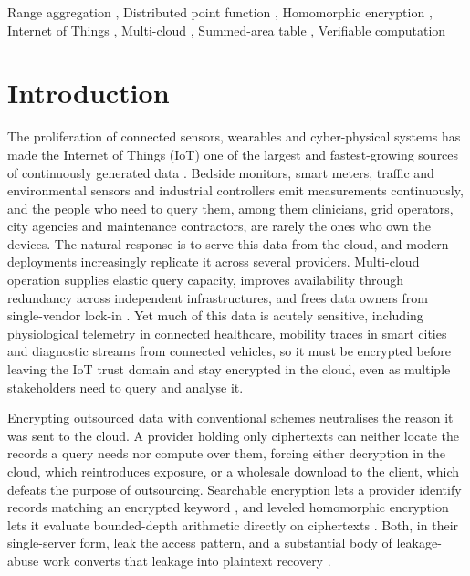 \documentclass[a4paper,fleqn]{cas-sc}
\begin{document}
\begin{keywords}
Range aggregation \sep
Distributed point function \sep
Homomorphic encryption \sep
Internet of Things \sep
Multi-cloud \sep
Summed-area table \sep
Verifiable computation
\end{keywords}

\maketitle

\section{Introduction}
\label{sec:intro}

The proliferation of connected sensors, wearables and cyber-physical systems
has made the Internet of Things (IoT) one of the largest and fastest-growing
sources of continuously generated data \citep{atzori2010internet}. Bedside
monitors, smart meters, traffic and environmental sensors and industrial
controllers emit measurements continuously, and the people who need to query
them, among them clinicians, grid operators, city agencies and maintenance
contractors, are rarely the ones who own the devices. The natural response is
to serve this data from the cloud, and modern deployments increasingly
replicate it across several providers. Multi-cloud operation supplies elastic
query capacity, improves availability through redundancy across independent
infrastructures, and frees data owners from single-vendor lock-in
\citep{petcu2013multicloud,grozev2014intercloud}. Yet much of this data is
acutely sensitive, including physiological telemetry in connected healthcare,
mobility traces in smart cities and diagnostic streams from connected
vehicles, so it must be encrypted before leaving the IoT trust domain and stay
encrypted in the cloud, even as multiple stakeholders need to query and
analyse it.

Encrypting outsourced data with conventional schemes neutralises the reason it
was sent to the cloud. A provider holding only ciphertexts can neither locate
the records a query needs nor compute over them, forcing either decryption in
the cloud, which reintroduces exposure, or a wholesale download to the client,
which defeats the purpose of outsourcing. Searchable encryption lets a
provider identify records matching an encrypted keyword
\citep{song2000practical,curtmola2006searchable,islam2023keyword}, and leveled
homomorphic encryption lets it evaluate bounded-depth arithmetic directly on
ciphertexts \citep{fan2012somewhat,cryptoeprint:2016/421}. Both, in their
single-server form, leak the access pattern, and a substantial body of
leakage-abuse work converts that leakage into plaintext recovery
\citep{islam2012access,cash2015leakage,grubbs2017leakage}.
\end{document}
